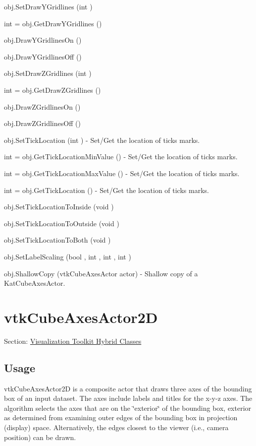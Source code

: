 \begin{DoxyItemize}
\item {\ttfamily obj.\-Set\-Draw\-Y\-Gridlines (int )}  
\item {\ttfamily int = obj.\-Get\-Draw\-Y\-Gridlines ()}  
\item {\ttfamily obj.\-Draw\-Y\-Gridlines\-On ()}  
\item {\ttfamily obj.\-Draw\-Y\-Gridlines\-Off ()}  
\item {\ttfamily obj.\-Set\-Draw\-Z\-Gridlines (int )}  
\item {\ttfamily int = obj.\-Get\-Draw\-Z\-Gridlines ()}  
\item {\ttfamily obj.\-Draw\-Z\-Gridlines\-On ()}  
\item {\ttfamily obj.\-Draw\-Z\-Gridlines\-Off ()}  
\item {\ttfamily obj.\-Set\-Tick\-Location (int )} -\/ Set/\-Get the location of ticks marks.  
\item {\ttfamily int = obj.\-Get\-Tick\-Location\-Min\-Value ()} -\/ Set/\-Get the location of ticks marks.  
\item {\ttfamily int = obj.\-Get\-Tick\-Location\-Max\-Value ()} -\/ Set/\-Get the location of ticks marks.  
\item {\ttfamily int = obj.\-Get\-Tick\-Location ()} -\/ Set/\-Get the location of ticks marks.  
\item {\ttfamily obj.\-Set\-Tick\-Location\-To\-Inside (void )}  
\item {\ttfamily obj.\-Set\-Tick\-Location\-To\-Outside (void )}  
\item {\ttfamily obj.\-Set\-Tick\-Location\-To\-Both (void )}  
\item {\ttfamily obj.\-Set\-Label\-Scaling (bool , int , int , int )}  
\item {\ttfamily obj.\-Shallow\-Copy (vtk\-Cube\-Axes\-Actor actor)} -\/ Shallow copy of a Kat\-Cube\-Axes\-Actor.  
\end{DoxyItemize}\hypertarget{vtkhybrid_vtkcubeaxesactor2d}{}\section{vtk\-Cube\-Axes\-Actor2\-D}\label{vtkhybrid_vtkcubeaxesactor2d}
Section\-: \hyperlink{sec_vtkhybrid}{Visualization Toolkit Hybrid Classes} \hypertarget{vtkwidgets_vtkxyplotwidget_Usage}{}\subsection{Usage}\label{vtkwidgets_vtkxyplotwidget_Usage}
vtk\-Cube\-Axes\-Actor2\-D is a composite actor that draws three axes of the bounding box of an input dataset. The axes include labels and titles for the x-\/y-\/z axes. The algorithm selects the axes that are on the \char`\"{}exterior\char`\"{} of the bounding box, exterior as determined from examining outer edges of the bounding box in projection (display) space. Alternatively, the edges closest to the viewer (i.\-e., camera position) can be drawn.

